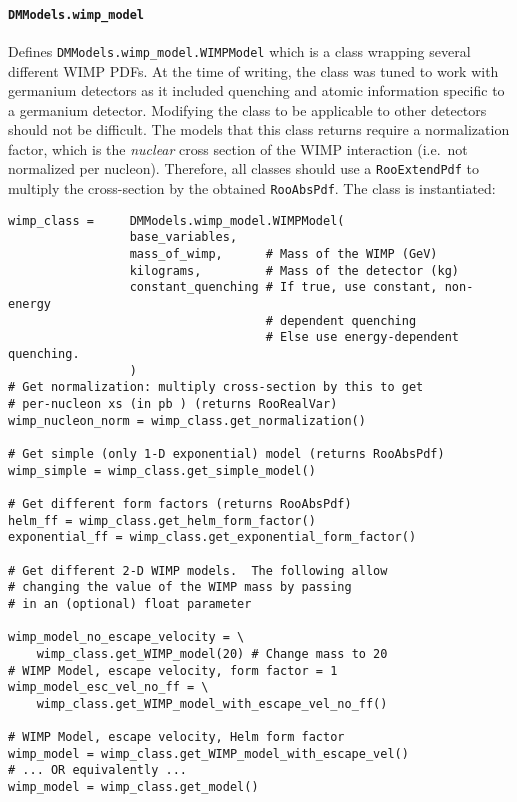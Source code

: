 			\paragraph{\lstinline!DMModels.wimp_model!}	
Defines \lstinline!DMModels.wimp_model.WIMPModel! which is a class wrapping several different WIMP PDFs.  At the time
of writing, the class was tuned to work with germanium detectors as it included quenching and atomic information
specific to a germanium detector.  Modifying the class to be applicable to other detectors should not be difficult.  
The models that this class returns require a normalization factor, which is the \emph{nuclear}
cross section of the WIMP interaction (i.e.~not normalized per nucleon).  
Therefore, all classes should use a \lstinline!RooExtendPdf! to multiply the cross-section by the obtained \lstinline!RooAbsPdf!.  
The class is instantiated:
				\begin{lstlisting}			
wimp_class =     DMModels.wimp_model.WIMPModel(
                 base_variables, 
                 mass_of_wimp,      # Mass of the WIMP (GeV) 
                 kilograms,         # Mass of the detector (kg)
                 constant_quenching # If true, use constant, non-energy 
                                    # dependent quenching
                                    # Else use energy-dependent quenching.
                 )
# Get normalization: multiply cross-section by this to get 
# per-nucleon xs (in pb ) (returns RooRealVar)
wimp_nucleon_norm = wimp_class.get_normalization() 

# Get simple (only 1-D exponential) model (returns RooAbsPdf)
wimp_simple = wimp_class.get_simple_model()        

# Get different form factors (returns RooAbsPdf)
helm_ff = wimp_class.get_helm_form_factor()
exponential_ff = wimp_class.get_exponential_form_factor()

# Get different 2-D WIMP models.  The following allow
# changing the value of the WIMP mass by passing
# in an (optional) float parameter

wimp_model_no_escape_velocity = \
    wimp_class.get_WIMP_model(20) # Change mass to 20
# WIMP Model, escape velocity, form factor = 1
wimp_model_esc_vel_no_ff = \
    wimp_class.get_WIMP_model_with_escape_vel_no_ff()

# WIMP Model, escape velocity, Helm form factor
wimp_model = wimp_class.get_WIMP_model_with_escape_vel()
# ... OR equivalently ... 
wimp_model = wimp_class.get_model()

				\end{lstlisting}				

